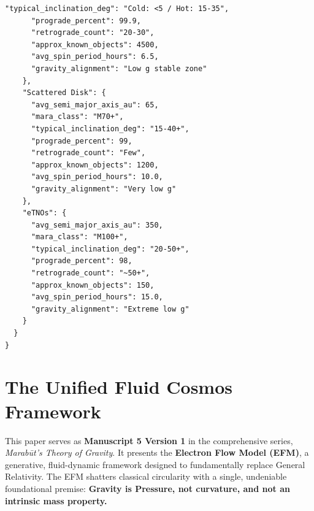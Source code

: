 \documentclass[11pt, a4paper]{article}
\begin{document}
\begin{lstlisting}[caption=Electron Flow Model Population Dataset (ready for GitHub + Python)]
      "typical_inclination_deg": "Cold: <5 / Hot: 15-35",
      "prograde_percent": 99.9,
      "retrograde_count": "20-30",
      "approx_known_objects": 4500,
      "avg_spin_period_hours": 6.5,
      "gravity_alignment": "Low g stable zone"
    },
    "Scattered Disk": {
      "avg_semi_major_axis_au": 65,
      "mara_class": "M70+",
      "typical_inclination_deg": "15-40+",
      "prograde_percent": 99,
      "retrograde_count": "Few",
      "approx_known_objects": 1200,
      "avg_spin_period_hours": 10.0,
      "gravity_alignment": "Very low g"
    },
    "eTNOs": {
      "avg_semi_major_axis_au": 350,
      "mara_class": "M100+",
      "typical_inclination_deg": "20-50+",
      "prograde_percent": 98,
      "retrograde_count": "~50+",
      "approx_known_objects": 150,
      "avg_spin_period_hours": 15.0,
      "gravity_alignment": "Extreme low g"
    }
  }
}
\end{lstlisting}

\clearpage
\section*{The Unified Fluid Cosmos Framework}
  This paper serves as \textbf{Manuscript 5 Version 1} in the comprehensive series, \textit{Marab\={u}t's Theory of Gravity}. It presents the \textbf{Electron Flow Model (EFM)}, a generative, fluid-dynamic framework designed to fundamentally replace General Relativity. The EFM shatters classical circularity with a single, undeniable foundational premise: \textbf{Gravity is Pressure, not curvature, and not an intrinsic mass property.}
\end{document}
